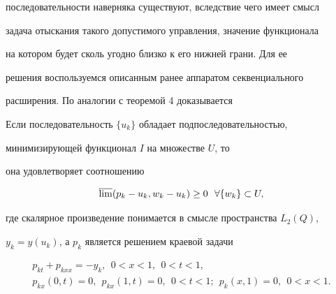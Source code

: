 последовательности наверняка существуют, вследствие чего имеет смысл 


задача отыскания такого допустимого управления, значение функционала 


на котором будет сколь угодно близко к его нижней грани. Для ее 


решения воспользуемся описанным ранее аппаратом секвенциального 


расширения. По аналогии с теоремой 4 доказывается 


 


\begin{thm} 


Если последовательность $\{u_k\}$ обладает подпоследовательностью, 


минимизирующей функционал $I$ на множестве $U$, то 


она удовлетворяет соотношению 


\begin{equation} 


\varlimsup(p_k-u_k,w_k-u_k)\ge0\ \ \forall\{w_k\}\subset U, 


\end{equation} 


где скалярное произведение понимается в смысле пространства $L_2(Q)$, 


$y_k=y(u_k)$, а $p_k$ является решением краевой задачи 


\begin{gather*} 


p_{kt}+p_{k xx}=-y_k,\ \ 0<x<1,\ \ 0<t<1, \\ 


% 


p_{kx}(0,t)=0,\ \ p_{kx}(1,t)=0,\ \ 0<t<1; 


\ \ p_k(x,1)=0,\ \ 0<x<1. 


\end{gather*} 


\end{thm} 


 


